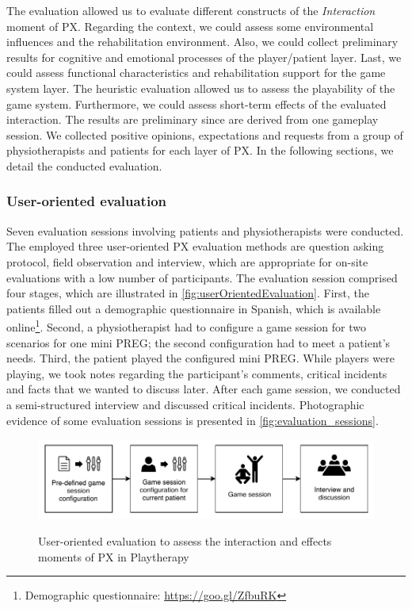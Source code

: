 The evaluation allowed us to evaluate different constructs of the \textit{Interaction} moment of \ac{PX}. Regarding the context, we could assess some environmental influences and the rehabilitation environment. Also, we could collect preliminary results for cognitive and emotional processes of the player/patient layer. Last, we could assess functional characteristics and rehabilitation support for the game system layer. The heuristic evaluation allowed us to assess the playability of the game system. Furthermore, we could assess short-term effects of the evaluated interaction. The results are preliminary since are derived from one gameplay session. We collected positive opinions, expectations and requests from a group of physiotherapists and patients for each layer of \ac{PX}. In the following sections, we detail the conducted evaluation.

\subsubsection{User-oriented evaluation}
Seven evaluation sessions involving patients and physiotherapists were conducted. The employed three user-oriented \ac{PX} evaluation methods are question asking protocol, field observation and interview, which are appropriate for on-site evaluations with a low number of participants. The evaluation session comprised four stages, which are illustrated in \autoref{fig:userOrientedEvaluation}. First, the patients filled out a demographic questionnaire in Spanish, which is available online\footnote{Demographic questionnaire: \url{https://goo.gl/ZfbuRK}}. Second, a physiotherapist had to configure a game session for two scenarios for one mini \ac{PREG}; the second configuration had to meet a patient's needs. Third, the patient played the configured mini \ac{PREG}. While players were playing, we took notes regarding the participant's comments, critical incidents and facts that we wanted to discuss later. After each game session, we conducted a semi-structured interview and discussed critical incidents. Photographic evidence of some evaluation sessions is presented in \autoref{fig:evaluation_sessions}.

\begin{figure}[bth]
\myfloatalign
{\includegraphics[width=.9\linewidth]{gfx/playtherapy/userOrientedEvaluation}} \quad
\caption{User-oriented evaluation to assess the interaction and effects moments of \ac{PX} in Playtherapy}
\label{fig:userOrientedEvaluation}
\end{figure}

